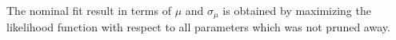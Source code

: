 The nominal fit result in terms of $\mu$ and $\sigma_{\mu}$ is obtained by maximizing the likelihood function with respect to all parameters which was not pruned away.


